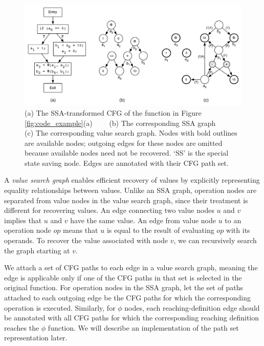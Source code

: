 \documentclass[12pt]{gatech-thesis}
\begin{document}
\begin{figure}
\centering
\includegraphics[width=400pt]{figures1/CFG.pdf}
\caption{(a) The SSA-transformed CFG of the function in Figure \ref{fig:code_example}(a)$\quad\quad$ (b) The corresponding SSA graph $\quad\quad$ (c) The corresponding value search graph. Nodes with bold outlines are available nodes; outgoing edges for these nodes are omitted because available nodes need not be recovered. `SS' is the special state saving node. Edges are annotated with their CFG path set.}
\label{fig:VSG}
\end{figure}




A \emph{value search graph} enables efficient recovery of values by explicitly representing equality relationships between values. 
Unlike an SSA graph, operation nodes are separated from value nodes in the value search graph, since their treatment is different for recovering values.
An edge connecting two value nodes $u$ and $v$ implies that $u$ and $v$ have the same value. 
An edge from value node $u$ to an operation node $op$ means that  $u$ is equal to the result of evaluating $op$ with its operands. 
To recover the value associated with node $v$, we can recursively search the graph starting at $v$.  

We attach a set of CFG paths to each edge in a value search graph, meaning the edge is applicable only if one of the CFG paths in that set is selected in the original function.
For operation nodes in the SSA graph, let the set of paths attached to each outgoing edge be the CFG paths for which the corresponding operation is executed. 
Similarly, for $\phi$ nodes, each reaching-definition edge should be annotated with all CFG paths for which the corresponding reaching definition reaches the $\phi$ function. 
We will describe an implementation of the path set representation later.
\end{document}
